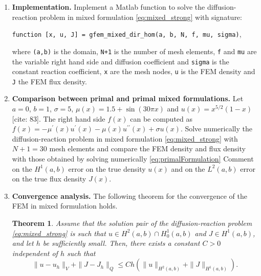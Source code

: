 \documentclass{article}
\newtheorem{theorem}{Theorem}
\begin{document}
\begin{enumerate}[label=\alph*)]
    Compute analitically the degrees of freedom $\{J_{i}\}_{i=1}^{N+1}$ and compare them with those obtained in point a, using the definition $\overline{\overline{\mu}}|_{i}:=(\overline{\mu^{-1}}|_{i})^{-1}$ of the harmonic average of $\mu(x)$ over $[x_{i-1},x_{i}]$. Recall that for $g \in L^1(x_{i-1}, x_i)$ the integral average of a function is defined as:
    \begin{equation} 
        \overline{g}|_i = \frac{1}{h} \int_{x_{i-1}}^{x_i} g(x) \, dx
        \label{AvgFunction}
    \end{equation}
 
    \item \textbf{Implementation.} Implement a Matlab function to solve the diffusion-reaction problem in mixed formulation \eqref{eq:mixed_strong} with signature: \newline
    \begin{center}
        \texttt{function [x, u, J] = gfem\_mixed\_dir\_hom(a, b, N, f, mu, sigma)}, \newline     
    \end{center}
    where \texttt{(a,b)} is the domain, \texttt{N+1} is the number of mesh elements, \texttt{f} and \texttt{mu} are the variable right hand side and diffusion coefficient and \texttt{sigma} is the constant reaction coefficient, \texttt{x} are the mesh nodes, \texttt{u} is the FEM density and \texttt{J} the FEM flux density.

    \item \textbf{Comparison between primal and primal mixed formulations.} Let $a=0$, $b=1$, $\sigma=5$, $\mu(x)=1.5+\sin(30\pi x)$ and $u(x)=x^{5/2}(1-x)$[cite: 83]. The right hand side $f(x)$ can be computed as $f(x)=-\mu^{\prime}(x)u^{\prime}(x)-\mu(x)u^{\prime\prime}(x)+\sigma u(x)$.
    \newline Solve numerically the diffusion-reaction problem in mixed formulation \eqref{eq:mixed_strong} with $N+1=30$ mesh elements and compare the FEM density and flux density with those obtained by solving numerically \eqref{eq:primalFormulation} Comment on the $H^{1}(a,b)$ error on the true density $u(x)$ and on the $L^{2}(a,b)$ error on the true flux density $J(x)$.

    \item \textbf{Convergence analysis.} The following theorem for the convergence of the FEM in mixed formulation holds.

        \begin{theorem}
        Assume that the solution pair of the diffusion-reaction problem \eqref{eq:mixed_strong} 
        is such that $u \in H^2(a,b) \cap H^1_0(a,b)$ and $J \in H^1(a,b)$, and let $h$ be 
        sufficiently small. Then, there exists a constant $C > 0$ independent of $h$ such that
        \begin{equation} \label{eq:convergence_theorem}
            \|u - u_h\|_V + \|J - J_h\|_Q \leq C h \left( \|u\|_{H^2(a,b)} + \|J\|_{H^1(a,b)} \right).
        \end{equation}
        \end{theorem}
        

\end{enumerate}
\end{document}
